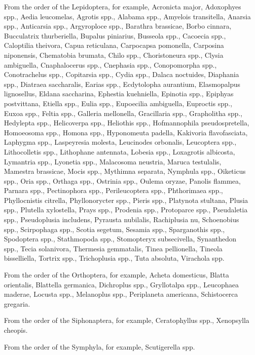 \documentclass[11pt,a4paper]{article}
\begin{document}
From the order of the Lepidoptera, for example, Acronicta major, Adoxophyes spp., Aedia leucomelas, Agrotis spp., Alabama spp., Amyelois transitella, Anarsia spp., Anticarsia spp., Argyroploce spp., Barathra brassicae, Borbo cinnara, Bucculatrix thurberiella, Bupalus piniarius, Busseola spp., Cacoecia spp., Caloptilia theivora, Capua reticulana, Carpocapsa pomonella, Carposina niponensis, Chematobia brumata, Chilo spp., Choristoneura spp., Clysia ambiguella, Cnaphalocerus spp., Cnephasia spp., Conopomorpha spp., Conotrachelus spp., Copitarsia spp., Cydia spp., Dalaca noctuides, Diaphania spp., Diatraea saccharalis, Earias spp., Ecdytolopha aurantium, Elasmopalpus lignosellus, Eldana saccharina, Ephestia kuehniella, Epinotia spp., Epiphyas postvittana, Etiella spp., Eulia spp., Eupoecilia ambiguella, Euproctis spp., Euxoa spp., Feltia spp., Galleria mellonella, Gracillaria spp., Grapholitha spp., Hedylepta spp., Helicoverpa spp., Heliothis spp., Hofmannophila pseudospretella, Homoeosoma spp., Homona spp., Hyponomeuta padella, Kakivoria flavofasciata, Laphygma spp., Laspeyresia molesta, Leucinodes orbonalis, Leucoptera spp., Lithocolletis spp., Lithophane antennata, Lobesia spp., Loxagrotis albicosta, Lymantria spp., Lyonetia spp., Malacosoma neustria, Maruca testulalis, Mamestra brassicae, Mocis spp., Mythimna separata, Nymphula spp., Oiketicus spp., Oria spp., Orthaga spp., Ostrinia spp., Oulema oryzae, Panolis flammea, Parnara spp., Pectinophora spp., Perileucoptera spp., Phthorimaea spp., Phyllocnistis citrella, Phyllonorycter spp., Pieris spp., Platynota stultana, Plusia spp., Plutella xylostella, Prays spp., Prodenia spp., Protoparce spp., Pseudaletia spp., Pseudoplusia includens, Pyrausta nubilalis, Rachiplusia nu, Schoenobius spp., Scirpophaga spp., Scotia segetum, Sesamia spp., Sparganothis spp., Spodoptera spp., Stathmopoda spp., Stomopteryx subsecivella, Synanthedon spp., Tecia solanivora, Thermesia gemmatalis, Tinea pellionella, Tineola bisselliella, Tortrix spp., Trichoplusia spp., Tuta absoluta, Virachola spp.

From the order of the Orthoptera, for example, Acheta domesticus, Blatta orientalis, Blattella germanica, Dichroplus spp., Gryllotalpa spp., Leucophaea maderae, Locusta spp., Melanoplus spp., Periplaneta americana, Schistocerca gregaria.

From the order of the Siphonaptera, for example, Ceratophyllus spp., Xenopsylla cheopis.

From the order of the Symphyla, for example, Scutigerella spp.
\end{document}
